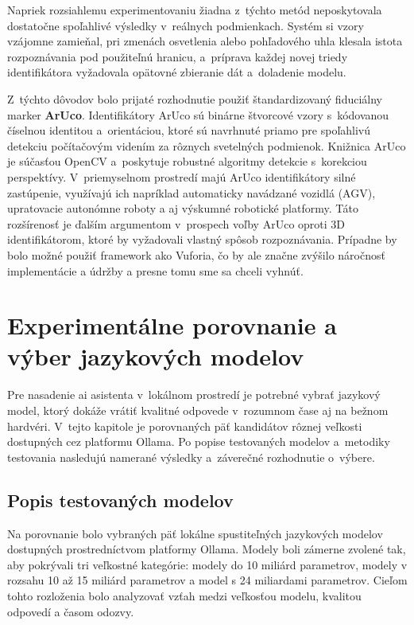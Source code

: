Napriek rozsiahlemu experimentovaniu žiadna z~týchto metód neposkytovala
dostatočne spoľahlivé výsledky v~reálnych podmienkach. Systém si vzory vzájomne
zamieňal, pri zmenách osvetlenia alebo pohľadového uhla klesala istota
rozpoznávania pod použiteľnú hranicu, a~príprava každej novej triedy
identifikátora vyžadovala opätovné zbieranie dát a~doladenie modelu.

Z~týchto dôvodov bolo prijaté rozhodnutie použiť štandardizovaný fiduciálny
marker \textbf{ArUco}. Identifikátory ArUco sú binárne štvorcové vzory
s~kódovanou číselnou identitou a~orientáciou, ktoré sú navrhnuté priamo pre
spoľahlivú detekciu počítačovým videním za rôznych svetelných podmienok.
Knižnica ArUco je súčasťou OpenCV a~poskytuje robustné algoritmy detekcie
s~korekciou perspektívy. V~priemyselnom prostredí majú ArUco identifikátory
silné zastúpenie, využívajú ich napríklad automaticky navádzané vozidlá (AGV),
upratovacie autonómne roboty a aj výskumné robotické platformy. Táto
rozšírenosť je ďalším argumentom v~prospech voľby ArUco oproti 3D
identifikátorom, ktoré by vyžadovali vlastný spôsob rozpoznávania. Prípadne by
bolo možné použiť framework ako Vuforia, čo by ale značne zvýšilo náročnosť
implementácie a údržby a presne tomu sme sa chceli vyhnúť.

\section{Experimentálne porovnanie a výber jazykových modelov}

Pre nasadenie \acrshort{ai} asistenta v~lokálnom prostredí je potrebné
vybrať jazykový model, ktorý dokáže vrátiť kvalitné odpovede v~rozumnom
čase aj na bežnom hardvéri. V~tejto kapitole je porovnaných päť kandidátov
rôznej veľkosti dostupných cez platformu Ollama. Po popise testovaných
modelov a~metodiky testovania nasledujú namerané výsledky a~záverečné
rozhodnutie o~výbere.

\subsection{Popis testovaných modelov}

Na porovnanie bolo vybraných päť lokálne spustiteľných jazykových modelov
dostupných prostredníctvom platformy Ollama. Modely boli zámerne zvolené tak,
aby pokrývali tri veľkostné kategórie: modely do 10 miliárd parametrov, modely
v rozsahu 10 až 15 miliárd parametrov a model s 24 miliardami parametrov.
Cieľom tohto rozloženia bolo analyzovať vzťah medzi veľkosťou modelu, kvalitou
odpovedí a časom odozvy.

